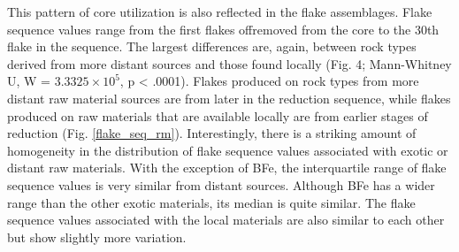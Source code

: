 \documentclass[]{elsarticle} %
\begin{document}
This pattern of core utilization is also reflected in the flake
assemblages. Flake sequence values range from the first flakes
offremoved from the core to the 30th flake in the sequence. The largest
differences are, again, between rock types derived from more distant
sources and those found locally (\hspace{0pt}Fig. 4\hspace{0pt};
Mann-Whitney U, W = \ensuremath{3.3325\times 10^{5}}, p \textless{}
.0001). Flakes produced on rock types from more distant raw material
sources are from later in the reduction sequence, while flakes produced
on raw materials that are available locally are from earlier stages of
reduction (\hspace{0pt}Fig. \ref{flake_seq_rm}\hspace{0pt}).
Interestingly, there is a striking amount of homogeneity in the
distribution of flake sequence values associated with exotic or distant
raw materials. With the exception of BFe, the interquartile range of
flake sequence values is very similar from distant sources. Although BFe
has a wider range than the other exotic materials, its median is quite
similar. The flake sequence values associated with the local materials
are also similar to each other but show slightly more variation.
\end{document}
